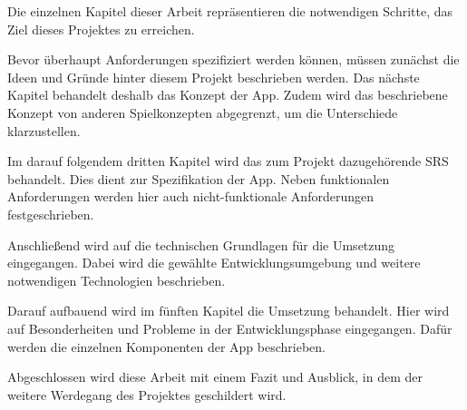 Die einzelnen Kapitel dieser Arbeit repräsentieren die notwendigen Schritte, das Ziel dieses Projektes zu erreichen.

Bevor überhaupt Anforderungen spezifiziert werden können, müssen zunächst die Ideen und Gründe hinter diesem Projekt beschrieben werden. Das nächste Kapitel behandelt deshalb das Konzept der App. Zudem wird das beschriebene Konzept von anderen Spielkonzepten abgegrenzt, um die Unterschiede klarzustellen.

Im darauf folgendem dritten Kapitel wird das zum Projekt dazugehörende \acf{SRS} behandelt. Dies dient zur Spezifikation der App. Neben funktionalen Anforderungen werden hier auch nicht-funktionale Anforderungen festgeschrieben.

Anschließend wird auf die technischen Grundlagen für die Umsetzung eingegangen. Dabei wird die gewählte Entwicklungsumgebung und weitere notwendigen Technologien beschrieben.

Darauf aufbauend wird im fünften Kapitel die Umsetzung behandelt. Hier wird auf Besonderheiten und Probleme in der Entwicklungsphase eingegangen. Dafür werden die einzelnen Komponenten der App beschrieben.

Abgeschlossen wird diese Arbeit mit einem Fazit und Ausblick, in dem der weitere Werdegang des Projektes geschildert wird.